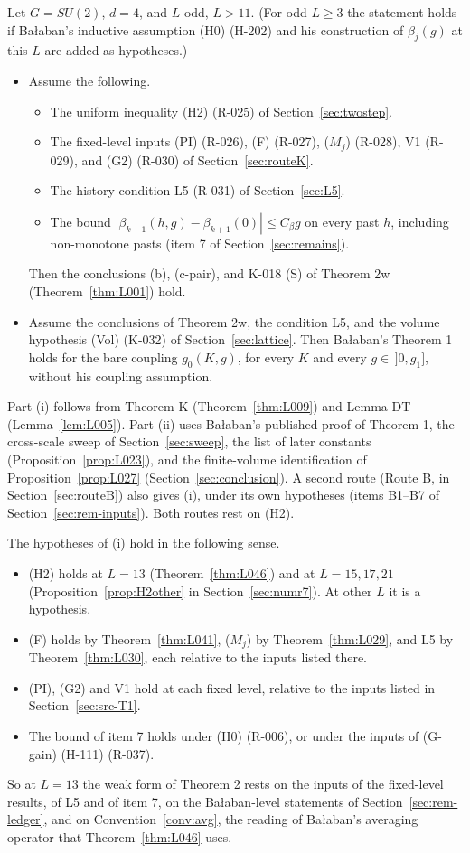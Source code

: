 \begin{mainthm}\label{thm:L002}
Let $G=SU(2)$, $d=4$, and $L$ odd, $L>11$. (For odd $L\ge3$ the statement holds if Ba{\l}aban's inductive assumption (H0) (H-202) and his construction of $\beta_j(g)$ at this $L$ are added as hypotheses.)
\begin{itemize}
\item[(i)] Assume the following.
\begin{itemize}
\item The uniform inequality (H2) (R-025) of Section~\ref{sec:twostep}.
\item The fixed-level inputs (PI) (R-026), (F) (R-027), ($M_j$) (R-028), V1 (R-029), and (G2) (R-030) of Section~\ref{sec:routeK}.
\item The history condition L5 (R-031) of Section~\ref{sec:L5}.
\item The bound $|\beta_{k+1}(h,g)-\beta_{k+1}(0)|\le C_\beta g$ on every past $h$, including non-monotone pasts (item 7 of Section~\ref{sec:remains}).
\end{itemize}
Then the conclusions (b), (c-pair), and K-018 (S) of Theorem 2w (Theorem~\ref{thm:L001}) hold.
\item[(ii)] Assume the conclusions of Theorem 2w, the condition L5, and the volume hypothesis (Vol) (K-032) of Section~\ref{sec:lattice}. Then Ba{\l}aban's Theorem 1 holds for the bare coupling $g_0(K,g)$, for every $K$ and every $g\in\,]0,g_1]$, without his coupling assumption.
\end{itemize}
\end{mainthm}
Part (i) follows from Theorem K (Theorem~\ref{thm:L009}) and Lemma DT (Lemma~\ref{lem:L005}). Part (ii) uses Ba{\l}aban's published proof of Theorem 1, the cross-scale sweep of Section~\ref{sec:sweep}, the list of later constants (Proposition~\ref{prop:L023}), and the finite-volume identification of Proposition~\ref{prop:L027} (Section~\ref{sec:conclusion}). A second route (Route B, \ThmPW{} in Section~\ref{sec:routeB}) also gives (i), under its own hypotheses (items B1--B7 of Section~\ref{sec:rem-inputs}). Both routes rest on (H2).

The hypotheses of (i) hold in the following sense.
\begin{itemize}
\item (H2) holds at $L=13$ (Theorem~\ref{thm:L046}) and at $L=15,17,21$ (Proposition~\ref{prop:H2other} in Section~\ref{sec:numr7}). At other $L$ it is a hypothesis.
\item (F) holds by Theorem~\ref{thm:L041}, ($M_j$) by Theorem~\ref{thm:L029}, and L5 by Theorem~\ref{thm:L030}, each relative to the inputs listed there.
\item (PI), (G2) and V1 hold at each fixed level, relative to the inputs listed in Section~\ref{sec:src-T1}.
\item The bound of item 7 holds under (H0) (R-006), or under the inputs of (G-gain) (H-111) (R-037).
\end{itemize}
So at $L=13$ the weak form of Theorem 2 rests on the inputs of the fixed-level results, of L5 and of item 7, on the Ba{\l}aban-level statements of Section~\ref{sec:rem-ledger}, and on Convention~\ref{conv:avg}, the reading of Ba{\l}aban's averaging operator that Theorem~\ref{thm:L046} uses.

